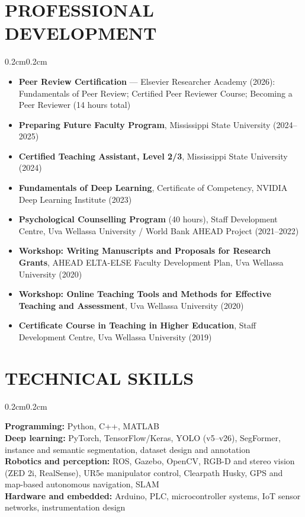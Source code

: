 \documentclass[10pt, letterpaper]{article}
\newenvironment{highlights}{%
    \begin{itemize}[topsep=0.08cm, parsep=0.08cm, partopsep=0pt,
                    itemsep=0pt, leftmargin=0.4cm + 10pt]
}{\end{itemize}}
\newenvironment{onecolentry}{%
    \begin{adjustwidth}{0.2cm}{0.2cm}
}{\end{adjustwidth}}
\begin{document}
\section{PROFESSIONAL DEVELOPMENT}
\vspace{0.08cm}
\begin{onecolentry}
    \begin{highlights}
        \item \textbf{Peer Review Certification} --- Elsevier Researcher Academy
              (2026): Fundamentals of Peer Review; Certified Peer Reviewer Course;
              Becoming a Peer Reviewer (14 hours total)
        \item \textbf{Preparing Future Faculty Program}, Mississippi State University
              (2024--2025)
        \item \textbf{Certified Teaching Assistant, Level 2/3}, Mississippi State
              University (2024)
        \item \textbf{Fundamentals of Deep Learning}, Certificate of Competency,
              NVIDIA Deep Learning Institute (2023)
        \item \textbf{Psychological Counselling Program} (40 hours), Staff Development
              Centre, Uva Wellassa University / World Bank AHEAD Project (2021--2022)
        \item \textbf{Workshop: Writing Manuscripts and Proposals for Research Grants},
              AHEAD ELTA-ELSE Faculty Development Plan, Uva Wellassa University (2020)
        \item \textbf{Workshop: Online Teaching Tools and Methods for Effective
              Teaching and Assessment}, Uva Wellassa University (2020)
        \item \textbf{Certificate Course in Teaching in Higher Education},
              Staff Development Centre, Uva Wellassa University (2019)
    \end{highlights}
\end{onecolentry}
\vspace{0.10cm}

\section{TECHNICAL SKILLS}
\vspace{0.08cm}
\begin{onecolentry}
    \textbf{Programming:} Python, C++, MATLAB \\
    \textbf{Deep learning:} PyTorch, TensorFlow/Keras, YOLO (v5--v26), SegFormer,
    instance and semantic segmentation, dataset design and annotation \\
    \textbf{Robotics and perception:} ROS, Gazebo, OpenCV, RGB-D and stereo
    vision (ZED 2i, RealSense), UR5e manipulator control, Clearpath Husky,
    GPS and map-based autonomous navigation, SLAM \\
    \textbf{Hardware and embedded:} Arduino, PLC, microcontroller systems,
    IoT sensor networks, instrumentation design
\end{onecolentry}
\vspace{0.10cm}
\end{document}
